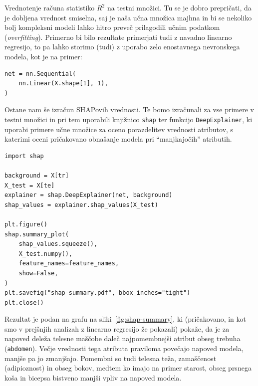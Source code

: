 Vrednotenje računa statistiko \(R^2\) na testni množici. Tu se je dobro prepričati, da je dobljena vrednost smiselna, saj je naša učna množica majhna in bi se nekoliko bolj kompleksni modeli lahko hitro preveč prilagodili učnim podatkom ({\em overfitting}). Primerno bi bilo rezultate primerjati tudi z navadno linearno regresijo, to pa lahko storimo (tudi) z uporabo zelo enostavnega nevronskega modela, kot je na primer:
%
%
\vspace*{3mm}
\begin{lstlisting}
net = nn.Sequential(
    nn.Linear(X.shape[1], 1),
)
\end{lstlisting}

Ostane nam še izračun SHAPovih vrednosti. Te bomo izračunali za vse primere v testni množici in pri tem uporabili knjižnico \texttt{shap} ter funkcijo \texttt{DeepExplainer}, ki uporabi primere učne množice za oceno porazdelitev vrednosti atributov, s katerimi oceni pričakovano obnašanje modela pri ``manjkajočih'' atributih.

\vspace*{3mm}
\begin{lstlisting}
import shap

background = X[tr]
X_test = X[te]
explainer = shap.DeepExplainer(net, background)
shap_values = explainer.shap_values(X_test)

plt.figure()
shap.summary_plot(
    shap_values.squeeze(),
    X_test.numpy(),
    feature_names=feature_names,
    show=False,
)
plt.savefig("shap-summary.pdf", bbox_inches="tight")
plt.close()
\end{lstlisting}

Rezultat je podan na grafu na sliki~\ref{fig:shap-summary}, ki (pričakovano, in kot smo v prejšnjih analizah z linearno regresijo že pokazali) pokaže, da je za napoved deleža telesne maščobe daleč najpomembnejši atribut obseg trebuha (\texttt{abdomen}). Večje vrednosti tega atributa praviloma povečajo napoved modela, manjše pa jo zmanjšajo. Pomembni so tudi telesna teža, zamaščenost (adipioznost) in obseg bokov, medtem ko imajo na primer starost, obseg prsnega koša in bicepsa bistveno manjši vpliv na napoved modela.

